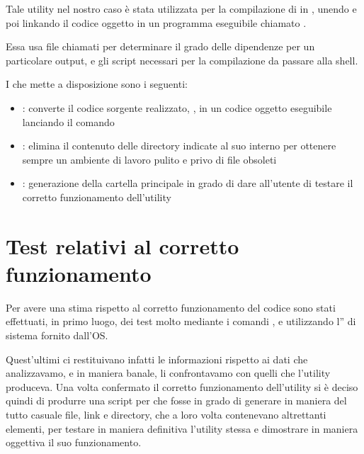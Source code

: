 \documentclass[letterpaper,10pt,italian,openany,oneside]{sphinxmanual}
\begin{document}
Tale utility nel nostro caso è stata utilizzata per la compilazione di  in , unendo e poi linkando il codice oggetto
in un programma eseguibile chiamato .

Essa usa file chiamati  per determinare il grado delle dipendenze per un particolare output, e gli script
necessari per la compilazione da passare alla shell.

I  che mette a disposizione sono i seguenti:
\begin{itemize}
\item {} 
: converte il codice sorgente realizzato, , in un codice oggetto eseguibile lanciando il comando 

\item {} 
: elimina il contenuto delle directory indicate al suo interno per ottenere sempre un ambiente di lavoro pulito e privo di file obsoleti

\item {} 
: generazione della cartella principale  in grado di dare all’utente  di testare il corretto funzionamento dell’utility 

\end{itemize}


\section{Test relativi al corretto funzionamento}
\label{\detokenize{project:test-relativi-al-corretto-funzionamento}}
Per avere una stima rispetto al corretto funzionamento del codice sono stati effettuati, in primo luogo,
dei test molto  mediante i comandi ,  e utilizzando l” di sistema fornito dall’OS.

Quest’ultimi ci restituivano infatti le informazioni  rispetto ai dati che analizzavamo, e in
maniera banale, li confrontavamo con quelli che l’utility produceva. Una volta confermato il corretto funzionamento
dell’utility si è deciso quindi di produrre una script per  che fosse in grado di generare in maniera del tutto
casuale file, link e directory, che a loro volta contenevano altrettanti elementi, per testare in maniera definitiva
l’utility stessa e dimostrare in maniera oggettiva il suo funzionamento.
\end{document}
